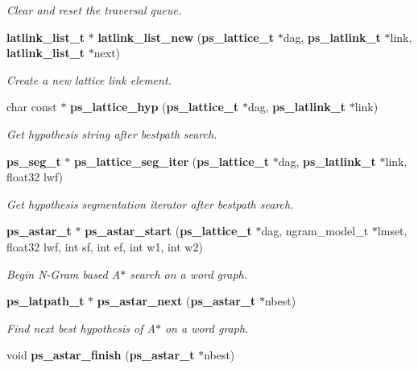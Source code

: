 \begin{DoxyCompactItemize}
\begin{DoxyCompactList}\small\item\em Clear and reset the traversal queue. \end{DoxyCompactList}\item 
{\bf latlink\-\_\-list\-\_\-t} $\ast$ {\bf latlink\-\_\-list\-\_\-new} ({\bf ps\-\_\-lattice\-\_\-t} $\ast$dag, {\bf ps\-\_\-latlink\-\_\-t} $\ast$link, {\bf latlink\-\_\-list\-\_\-t} $\ast$next)\label{ps__lattice__internal_8h_a7197508af770064ea825bb812dd6eddc}

\begin{DoxyCompactList}\small\item\em Create a new lattice link element. \end{DoxyCompactList}\item 
char const $\ast$ {\bf ps\-\_\-lattice\-\_\-hyp} ({\bf ps\-\_\-lattice\-\_\-t} $\ast$dag, {\bf ps\-\_\-latlink\-\_\-t} $\ast$link)\label{ps__lattice__internal_8h_a02b07c009d23b852bd4db54700dfac5b}

\begin{DoxyCompactList}\small\item\em Get hypothesis string after bestpath search. \end{DoxyCompactList}\item 
{\bf ps\-\_\-seg\-\_\-t} $\ast$ {\bf ps\-\_\-lattice\-\_\-seg\-\_\-iter} ({\bf ps\-\_\-lattice\-\_\-t} $\ast$dag, {\bf ps\-\_\-latlink\-\_\-t} $\ast$link, float32 lwf)\label{ps__lattice__internal_8h_afedbc5558c18f7d029e84a4e27e38187}

\begin{DoxyCompactList}\small\item\em Get hypothesis segmentation iterator after bestpath search. \end{DoxyCompactList}\item 
{\bf ps\-\_\-astar\-\_\-t} $\ast$ {\bf ps\-\_\-astar\-\_\-start} ({\bf ps\-\_\-lattice\-\_\-t} $\ast$dag, ngram\-\_\-model\-\_\-t $\ast$lmset, float32 lwf, int sf, int ef, int w1, int w2)
\begin{DoxyCompactList}\small\item\em Begin N-\/\-Gram based A$\ast$ search on a word graph. \end{DoxyCompactList}\item 
{\bf ps\-\_\-latpath\-\_\-t} $\ast$ {\bf ps\-\_\-astar\-\_\-next} ({\bf ps\-\_\-astar\-\_\-t} $\ast$nbest)
\begin{DoxyCompactList}\small\item\em Find next best hypothesis of A$\ast$ on a word graph. \end{DoxyCompactList}\item 
void {\bf ps\-\_\-astar\-\_\-finish} ({\bf ps\-\_\-astar\-\_\-t} $\ast$nbest)\label{ps__lattice__internal_8h_abfb03e9e0fcbe3def45120f5ba43be14}


\end{DoxyCompactItemize}
